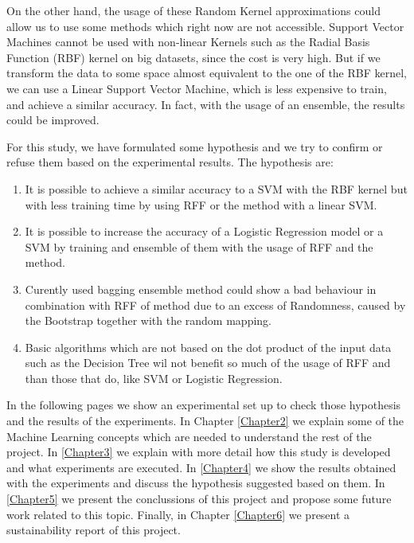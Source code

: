 \begin{pre-delivery}
  On the other hand, the usage of these Random Kernel approximations could
  allow us to use some methods which right now are not accessible. Support
  Vector Machines cannot be used with non-linear Kernels such as the Radial
  Basis Function (RBF) kernel on big datasets, since the cost is very high. But if
  we transform the data to some space almost equivalent to the one of the
  RBF kernel, we can use a Linear Support Vector Machine, which is less
  expensive to train, and achieve a similar accuracy. In fact, with the usage
  of an ensemble, the results could be improved.

  For this study, we have formulated some hypothesis and we try to confirm or
  refuse them based on the experimental results. The hypothesis are:
  \begin{enumerate}
    \item It is possible to achieve a similar accuracy to a SVM with the RBF
    kernel but with less training time by using RFF or the \Nys method with
    a linear SVM.
    \item It is possible to increase the accuracy of a Logistic Regression
    model or a SVM by training and ensemble of them with the usage of RFF
    and the \Nys method.
    \item Curently used bagging ensemble method could show a bad behaviour
    in combination with RFF of \Nys method due to an excess of Randomness,
    caused by the Bootstrap together with the random mapping.
    \item Basic algorithms which are not based on the dot product of the
    input data such as the Decision Tree wil not benefit so much of the
    usage of RFF and \Nys than those that do, like SVM or
    Logistic Regression.
  \end{enumerate}

  In the following pages we show an experimental set up to check those
  hypothesis and the results of the experiments. In Chapter \ref{Chapter2} we
  explain some of the Machine Learning concepts which are needed to understand
  the rest of the project. In \ref{Chapter3} we explain with more detail how
  this study is developed and what experiments are executed. In \ref{Chapter4}
  we show the results obtained with the experiments and discuss the hypothesis
  suggested based on them. In \ref{Chapter5} we present the conclussions of
  this project and propose some future work related to this topic. Finally,
  in Chapter \ref{Chapter6} we present a sustainability report of this project.

\end{pre-delivery}
